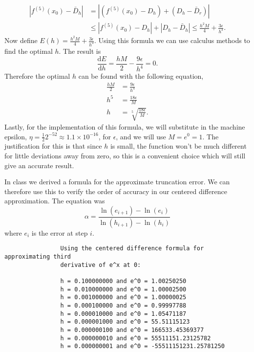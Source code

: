 \documentclass{article}
\begin{document}
\begin{enumerate}[label = \arabic*]
\begin{enumerate}
\begin{align*}
				|f^{(5)}(x_0) - \bar{D}_h| &= |(f^{(5)}(x_0) - D_h) + (D_h - \bar{D}_r)| \\
										&\leq |f^{(5)}(x_0) - D_h| + |D_h - \bar{D}_h| \leq \frac{h^2M}{4} + \frac{3 \epsilon}{h^3}.
			\end{align*}
			Now define $E(h) = \frac{h^2M}{4} + \frac{3 \epsilon}{h^3}.$ Using this formula we can use calculus methods to find the optimal $h$. The result is \[ \frac{\mathrm{d}E}{\mathrm{d}h} = \frac{hM}{2} - \frac{9\epsilon}{h^4} = 0. \] Therefore the optimal $h$ can be found with the following equation, 
			\begin{align*}
				\frac{hM}{2} &= \frac{9\epsilon}{h^4} \\
						 h^5 &= \frac{18\epsilon}{M} \\
						   h &= \sqrt[5]{\frac{18\epsilon}{M}}.
			\end{align*}
			Lastly, for the implementation of this formula, we will substitute in the machine epsilon, $\eta = \frac{1}{2}2^{-52} \approx 1.1 \times 10^{-16}$, for $\epsilon$, and we will use $M = e^0 = 1.$ The justification for this is that since $h$ is small, the function won't be much different for little deviations away from zero, so this is a convenient choice which will still give an accurate result.
			
			\hspace{15pt} In class we derived a formula for the approximate truncation error. We can therefore use this to verify the order of accuracy in our centered difference approximation. The equation was \[ \alpha = \frac{\ln(e_{i + 1}) - \ln(e_i)}{\ln(h_{i + 1}) - \ln(h_i)} \] where $e_i$ is the error at step $i$.
			
			
			
			\pagebreak
			
			\color{lightgray}
			\begin{verbatim}
				Using the centered difference formula for approximating third 
				derivative of e^x at 0:
				
				h = 0.100000000 and e^0 = 1.00250250
				h = 0.010000000 and e^0 = 1.00002500
				h = 0.001000000 and e^0 = 1.00000025
				h = 0.000100000 and e^0 = 0.99997788
				h = 0.000010000 and e^0 = 1.05471187
				h = 0.000001000 and e^0 = 55.51115123
				h = 0.000000100 and e^0 = 166533.45369377
				h = 0.000000010 and e^0 = 55511151.23125782
				h = 0.000000001 and e^0 = -55511151231.25781250
				

\end{verbatim}
\end{enumerate}
\end{enumerate}
\end{document}

